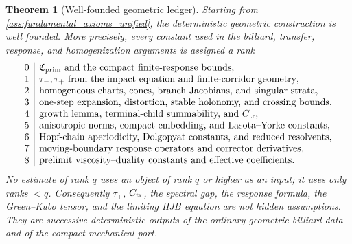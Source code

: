 \documentclass[12pt, letterpaper]{amsart}
\theoremstyle{plain}
\newtheorem{theorem}{Theorem}[section]
\theoremstyle{definition}
\theoremstyle{remark}
\begin{document}
\begin{theorem}[Well-founded geometric ledger]
\label{thm:well_founded_geometric_ledger}
Starting from \cref{ass:fundamental_axioms_unified}, the deterministic
geometric construction is well founded.  More precisely, every constant used in
the billiard, transfer, response, and homogenization arguments is assigned a
rank
\begin{equation}
\label{eq:well_founded_geometric_ranks}
\begin{array}{c|l}
0 & \mathfrak C_{\rm prim} \text{ and the compact finite-response bounds},\\
1 & \tau_-,\tau_+ \text{ from the impact equation and finite-corridor geometry},\\
2 & \text{homogeneous charts, cones, branch Jacobians, and singular strata},\\
3 & \text{one-step expansion, distortion, stable holonomy, and crossing bounds},\\
4 & \text{growth lemma, terminal-child summability, and }C_{\rm tr},\\
5 & \text{anisotropic norms, compact embedding, and Lasota--Yorke constants},\\
6 & \text{Hopf-chain aperiodicity, Dolgopyat constants, and reduced resolvents},\\
7 & \text{moving-boundary response operators and corrector derivatives},\\
8 & \text{prelimit viscosity--duality constants and effective coefficients}.
\end{array}
\end{equation}
No estimate of rank $q$ uses an object of rank $q$ or higher as an input; it
uses only ranks $<q$.  Consequently $\tau_\pm$, $C_{\rm tr}$, the spectral gap,
the response formula, the Green--Kubo tensor, and the limiting HJB equation are
not hidden assumptions.  They are successive deterministic outputs of the
ordinary geometric billiard data and of the compact mechanical port.
\end{theorem}
\end{document}

